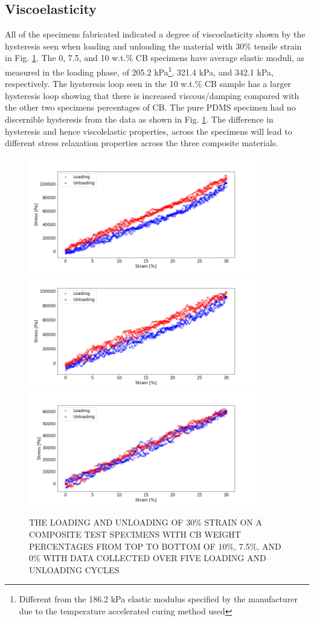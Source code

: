 \subsection*{Viscoelasticity}
All of the specimens fabricated indicated a degree of viscoelasticity shown by the hysteresis seen when loading and unloading the material with 30\% tensile strain in Fig. \ref{fig:loading-and-unloading-specimens}. The 0, 7.5, and 10 w.t.\% CB specimens have average elastic moduli, as measured in the loading phase, of 205.2 kPa\footnote{Different from the 186.2 kPa elastic modulus specified by the manufacturer due to the temperature accelerated curing method used}, 321.4 kPa, and 342.1 kPa, respectively. The hysteresis loop seen in the 10 w.t.\% CB sample has a larger hysteresis loop showing that there is increased viscous/damping compared with the other two specimens percentages of CB. The pure PDMS specimen had no discernible hysteresis from the data as shown in Fig. \ref{fig:loading-and-unloading-specimens}.  The difference in hysteresis and hence viscolelastic properties, across the specimens will lead to different stress relaxation properties across the three composite materials.
\begin{figure}[H]
	\centering
	\includegraphics[width=10cm]{Figures/load_unload_1_10_E4pin_20mm_v9_0.3Strain.png}
	\includegraphics[width=10cm]{Figures/load_unload_2_7-5_E4pin_20mm_v10_0.3Strain.png}
	\includegraphics[width=10cm]{Figures/load_unload_1_CB0_v1_0.3Strain.png}
	\caption{THE LOADING AND UNLOADING OF 30\% STRAIN ON A COMPOSITE TEST SPECIMENS WITH CB WEIGHT PERCENTAGES FROM TOP TO BOTTOM OF 10\%, 7.5\%, AND 0\% WITH DATA COLLECTED OVER FIVE LOADING AND UNLOADING CYCLES}
	\label{fig:loading-and-unloading-specimens}
\end{figure}


